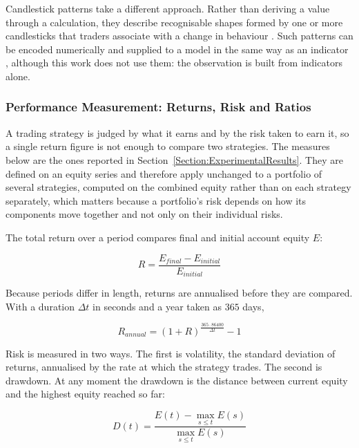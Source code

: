 Candlestick patterns take a different approach. Rather than deriving a value through a calculation, they describe recognisable shapes formed by one or more candlesticks that traders associate with a change in behaviour \cite{rhoads_candlestick_2022}. Such patterns can be encoded numerically and supplied to a model in the same way as an indicator \cite{jansen_machine_2020}, although this work does not use them: the observation is built from indicators alone.

\subsubsection{Performance Measurement: Returns, Risk and Ratios}
\label{Subsection:PerformanceMeasurement}

A trading strategy is judged by what it earns and by the risk taken to earn it, so a single return figure is not enough to compare two strategies. The measures below are the ones reported in Section~\ref{Section:ExperimentalResults}. They are defined on an equity series and therefore apply unchanged to a portfolio of several strategies, computed on the combined equity rather than on each strategy separately, which matters because a portfolio's risk depends on how its components move together and not only on their individual risks.

The total return over a period compares final and initial account equity $E$:

\begin{equation}
R = \frac{E_{final} - E_{initial}}{E_{initial}}
\end{equation}

Because periods differ in length, returns are annualised before they are compared. With a duration $\Delta t$ in seconds and a year taken as $365$ days,

\begin{equation}
R_{annual} = (1 + R)^{\frac{365 \cdot 86400}{\Delta t}} - 1
\label{Equation:AnnualizedReturn}
\end{equation}

Risk is measured in two ways. The first is volatility, the standard deviation of returns, annualised by the rate at which the strategy trades. The second is drawdown. At any moment the drawdown is the distance between current equity and the highest equity reached so far:

\begin{equation}
D(t) = \frac{E(t) - \max_{s \leq t} E(s)}{\max_{s \leq t} E(s)}
\label{Equation:Drawdown}
\end{equation}

